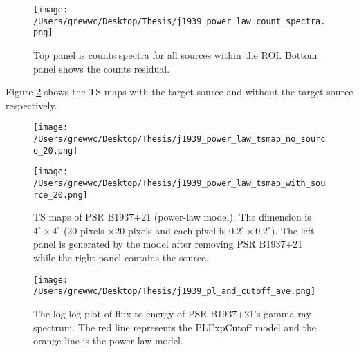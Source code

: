 \documentclass[12pt]{report}
\begin{document}
            \begin{figure}
              \centering 
              \texttt{[image: /Users/grewwc/Desktop/Thesis/j1939\_power\_law\_count\_spectra.png]}
              \caption{Top panel is counts spectra for all sources within the ROI. Bottom panel  
                shows the counts residual. }
              \label{fig: j1939_power_law_count_spectra}
            \end{figure}

            Figure \ref{fig: j1939_power_law_tsmap_withsource_20} shows the TS maps with the 
            target source and without the target source respectively. 

            \begin{figure}[!htp]
              \begin{center}
              \begin{minipage}{0.45\textwidth}
                \begin{center} 
                  \texttt{[image: /Users/grewwc/Desktop/Thesis/j1939\_power\_law\_tsmap\_no\_source\_20.png]}
                \end{center}
              \end{minipage}
              \begin{minipage}{0.45\textwidth}
                \begin{center}
                  \texttt{[image: /Users/grewwc/Desktop/Thesis/j1939\_power\_law\_tsmap\_with\_source\_20.png]}
                \end{center}
              \end{minipage}
            \end{center}
 
            \caption{TS maps of PSR B1937+21 (power-law model). The dimension is $4^{\circ} \times 4^{\circ}$
              ($20$ pixels $\times 20$ pixels and each pixel is 
              $0.2^{\circ} \times 0.2^{\circ}$). The left panel is generated by the model 
              after removing PSR B1937+21 while the right panel contains the source.}
            \label{fig: j1939_power_law_tsmap_withsource_20}
          \end{figure}

          \begin{figure}[!htp]
            \centering
            \texttt{[image: /Users/grewwc/Desktop/Thesis/j1939\_pl\_and\_cutoff\_ave.png]}
            \caption{The log-log plot of flux to energy of PSR B1937+21’s gamma-ray spectrum.
              The red line represents the PLExpCutoff model and the orange line is the power-law
              model. }
            \label{fig: j1939_pl_and_cutoff_ave}
          \end{figure}
\end{document}
